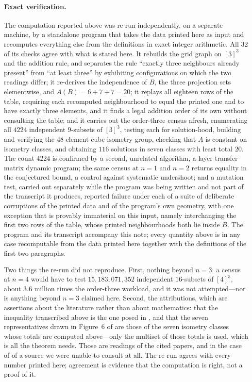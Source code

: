 \documentclass[11pt]{amsart}
\begin{document}
\paragraph{Exact verification.}
The computation reported above was re-run independently, on a separate
machine, by a standalone program that takes the data printed here as input
and recomputes everything else from the definitions in exact integer
arithmetic. All $32$ of its checks agree with what is stated here. It
rebuilds the grid graph on $[3]^3$ and the addition rule, and separates the
rule ``exactly three neighbours already present'' from ``at least three'' by
exhibiting configurations on which the two readings differ; it re-derives
the independence of $B$, the three projection sets elementwise, and
$A(B)=6+7+7=20$; it replays all eighteen rows of the table, requiring each
recomputed neighbourhood to equal the printed one and to have exactly three
elements, and it finds a legal addition order of its own without consulting
the table; and it carries out the order-three census afresh, enumerating all
$4224$ independent $9$-subsets of $[3]^3$, testing each for solution-hood,
building and verifying the $48$-element cube isometry group, checking that
$A$ is constant on isometry classes, and obtaining $116$ solutions in seven
classes with least total $20$. The count $4224$ is confirmed by a second,
unrelated algorithm, a layer transfer-matrix dynamic program; the same
census at $n=1$ and $n=2$ returns equality in the conjectured bound, a
control against systematic undershoot; and a mutation test, carried out
separately while the program was being written and not part of the transcript
it produces, reported failure under each of a suite of deliberate corruptions
of the printed data and of the program's own geometry, with one exception that
is provably immaterial on this input, namely interchanging the first two rows
of the table, whose printed neighbourhoods both lie inside $B$. The program
and its transcript accompany this note; every quantity above is in any case
recomputable from the data printed here together with the definitions of the
first two paragraphs.

Two things the re-run did not reproduce. First, nothing beyond $n=3$: a
census at $n=4$ would have to test $15{,}183{,}071{,}352$ independent
$16$-subsets of $[4]^3$, about $3.6$ million times the order-three workload,
and it was not attempted---nor is anything beyond $n=3$ claimed here.
Second, the attributions, which are assertions about the literature rather
than about mathematics: that the inequality transcribed above is the one
posed in \cite{BKV}, and that the seven representatives drawn in Figure~6 of
\cite{BW} are those of the seven isometry classes whose totals are computed
above---only the multiset of those totals is used, which is all the theorem
needs. Those are readings of the cited papers, and in the case of \cite{BKV}
of a source we were unable to consult at all. The re-run agrees with every
number printed here; agreement is evidence that the computation is right,
not a proof of it.
\end{document}
